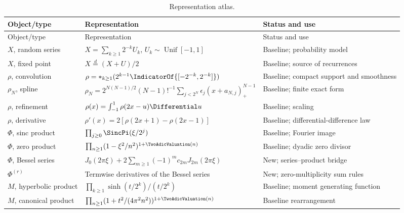 \documentclass[11pt]{article}
\theoremstyle{definition}
\theoremstyle{remark}
\begin{document}
\small
\begin{longtable}{p{}p{}p{}}
\caption{Representation atlas.}\label{p7:tab:atlas}\\
\toprule
Object/type & Representation & Status and use\\
\midrule
\endfirsthead
\toprule
Object/type & Representation & Status and use\\
\midrule
\endhead
\bottomrule
\endfoot

\(X\), random series &
\(X=\sum_{k\ge1}2^{-k}U_k\), \(U_k\sim\operatorname{Unif}[-1,1]\) &
Baseline; probability model\\

\(X\), fixed point &
\(X\stackrel d=(X+U)/2\) &
Baseline; source of recurrences\\

\(\rho\), convolution &
\(\rho=*_{k\ge1}(2^{k-1}\IndicatorOf{[-2^{-k},2^{-k}]})\) &
Baseline; compact support and smoothness\\

\(\rho_N\), spline &
\(\rho_N=2^{N(N-1)/2}(N-1)!^{-1}\sum_{j<2^N}\epsilon_j(x+a_{N,j})_+^{N-1}\) &
Baseline; finite exact form\\

\(\rho\), refinement &
\(\rho(x)=\int_{-1}^{1}\rho(2x-u)\Differential u\) &
Baseline; scaling\\

\(\rho\), derivative &
\(\rho'(x)=2[\rho(2x+1)-\rho(2x-1)]\) &
Baseline; differential-difference law\\

\(\Phi\), sinc product &
\(\prod_{j\ge0}\SincPi(\xi/2^j)\) &
Baseline; Fourier image\\

\(\Phi\), zero product &
\(\prod_{n\ge1}(1-\xi^2/n^2)^{1+\TwoAdicValuation(n)}\) &
Baseline; dyadic zero divisor\\

\(\Phi\), Bessel series &
\(J_0(2\pi\xi)+2\sum_{m\ge1}(-1)^mc_{2m}J_{2m}(2\pi\xi)\) &
New; series--product bridge\\

\(\Phi^{(r)}\) &
Termwise derivatives of the Bessel series &
New; zero-multiplicity sum rules\\

\(M\), hyperbolic product &
\(\prod_{k\ge1}\sinh(t/2^k)/(t/2^k)\) &
Baseline; moment generating function\\

\(M\), canonical product &
\(\prod_{n\ge1}(1+t^2/(4\pi^2n^2))^{1+\TwoAdicValuation(n)}\) &
Baseline rearrangement\\


\end{longtable}
\end{document}
